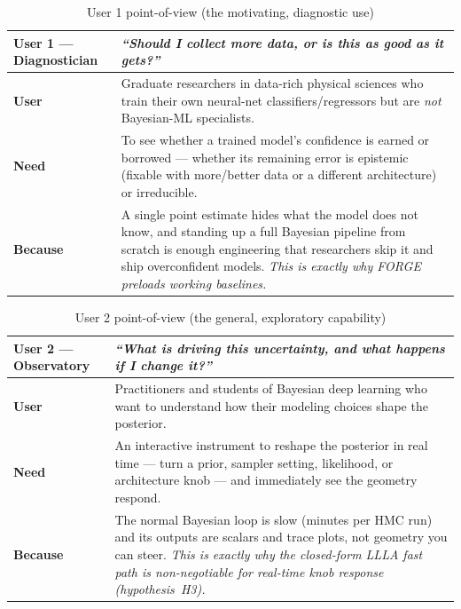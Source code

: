 \documentclass[11pt]{article}
\begin{document}
\begin{table}[H]
\centering\renewcommand{\arraystretch}{1.3}
\begin{tabularx}{\linewidth}{|l|Y|}
\hline
\textbf{User 1 --- Diagnostician} & \textit{``Should I collect more data, or is this as good as it gets?''} \\ \hline
\textbf{User} & Graduate researchers in data-rich physical sciences who train their own neural-net classifiers/regressors but are \emph{not} Bayesian-ML specialists. \\ \hline
\textbf{Need} & To see whether a trained model's confidence is earned or borrowed --- whether its remaining error is epistemic (fixable with more/better data or a different architecture) or irreducible. \\ \hline
\textbf{Because} & A single point estimate hides what the model does not know, and standing up a full Bayesian pipeline from scratch is enough engineering that researchers skip it and ship overconfident models. \emph{This is exactly why FORGE preloads working baselines.} \\ \hline
\end{tabularx}
\caption{User 1 point-of-view (the motivating, diagnostic use)}
\end{table}

\begin{table}[H]
\centering\renewcommand{\arraystretch}{1.3}
\begin{tabularx}{\linewidth}{|l|Y|}
\hline
\textbf{User 2 --- Observatory} & \textit{``What is driving this uncertainty, and what happens if I change it?''} \\ \hline
\textbf{User} & Practitioners and students of Bayesian deep learning who want to understand how their modeling choices shape the posterior. \\ \hline
\textbf{Need} & An interactive instrument to reshape the posterior in real time --- turn a prior, sampler setting, likelihood, or architecture knob --- and immediately see the geometry respond. \\ \hline
\textbf{Because} & The normal Bayesian loop is slow (minutes per HMC run) and its outputs are scalars and trace plots, not geometry you can steer. \emph{This is exactly why the closed-form LLLA fast path is non-negotiable for real-time knob response (hypothesis~H3).} \\ \hline
\end{tabularx}
\caption{User 2 point-of-view (the general, exploratory capability)}
\end{table}
\end{document}
